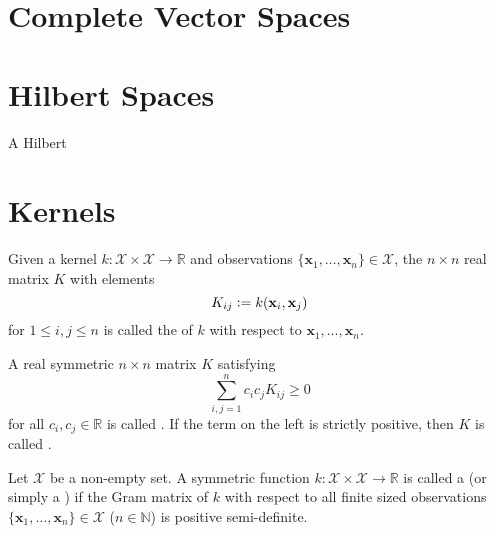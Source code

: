 \section{Complete Vector Spaces}

\section{Hilbert Spaces}

\begin{definition}
A Hilbert
\end{definition}


\section{Kernels}

\begin{definition}
Given a kernel $k : \mathcal{X} \times \mathcal{X} \to \mathbb{R}$ and observations $\{ \mathbf{x}_1, \dotsc, \mathbf{x}_n \} \in \mathcal{X}$, the $n \times n$ real matrix $K$ with elements
\begin{equation}
	K_{ij} \vcentcolon= k(\mathbf{x}_i, \mathbf{x}_j)
\end{equation}
for $1 \leq i, j \leq n$ is called the  of $k$ with respect to $\mathbf{x}_1, \dotsc, \mathbf{x}_n$.
\end{definition}

\begin{definition}
A real symmetric $n \times n$ matrix $K$ satisfying
\begin{equation}
	\sum_{i, j=1}^n c_i c_j K_{ij} \geq 0
\end{equation}
for all $c_i, c_j \in \mathbb{R}$ is called . If the term on the left is strictly positive, then $K$ is called .
\end{definition}

\begin{definition}
Let $\mathcal{X}$ be a non-empty set. A symmetric function $k : \mathcal{X} \times \mathcal{X} \to \mathbb{R}$ is called a  (or simply a ) if the Gram matrix of $k$ with respect to all finite sized observations $\{ \mathbf{x}_1, \dotsc, \mathbf{x}_n \} \in \mathcal{X}$ ($n \in \mathbb{N}$) is positive semi-definite.
\end{definition}

